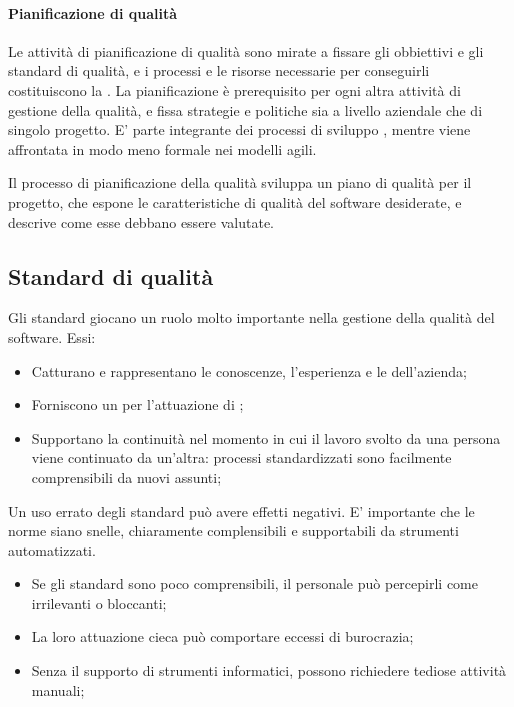 \paragraph{Pianificazione di qualità}
Le attività di pianificazione di qualità sono mirate a fissare gli obbiettivi e gli standard di qualità, e i processi e le risorse necessarie per conseguirli costituiscono la . La pianificazione è prerequisito per ogni altra attività di gestione della qualità, e fissa strategie e politiche sia a livello aziendale che di singolo progetto. E' parte integrante dei processi di sviluppo , mentre viene affrontata in modo meno formale nei modelli agili.

Il processo di pianificazione della qualità sviluppa un piano di qualità per il progetto, che espone le caratteristiche di qualità del software desiderate, e descrive come esse debbano essere valutate.

\subsection{Standard di qualità}
Gli standard giocano un ruolo molto importante nella gestione della qualità del software. Essi:
\begin{itemize}
	\item Catturano e rappresentano le conoscenze, l'esperienza e le  dell'azienda;
	\item Forniscono un  per l'attuazione di ;
	\item Supportano la continuità nel momento in cui il lavoro svolto da una persona viene continuato da un'altra: processi standardizzati sono facilmente comprensibili da nuovi assunti;
\end{itemize}

Un uso errato degli standard può avere effetti negativi. E' importante che le norme siano snelle, chiaramente complensibili e supportabili da strumenti automatizzati.
\begin{itemize}
	\item Se gli standard sono poco comprensibili, il personale può percepirli come irrilevanti o bloccanti;
	\item La loro attuazione cieca può comportare eccessi di burocrazia;
	\item Senza il supporto di strumenti informatici, possono richiedere tediose attività manuali;
\end{itemize}

